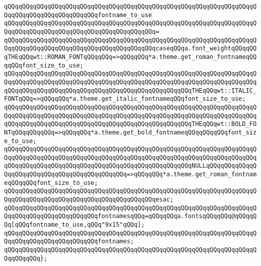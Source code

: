 \newline
\verb|qQQqqQQqqQQqqQQqqQQqqQQqqQQqqQQqqQQqqQQqqQQqqQQqqQQqqQQqqQQqqQQqqQQqqQQqqQQqqQQqqQQqqQQqqQQqqQQqfontname_to_use|\newline
\verb|qQQqqQQqqQQqqQQqqQQqqQQqqQQqqQQqqQQqqQQqqQQqqQQqqQQqqQQqqQQqqQQqqQQqqQQqqQQqqQQqqQQqqQQqqQQqqQQqqQQqqQQqqQQqqQQq=|\newline
\verb|qQQqqQQqqQQqqQQqqQQqqQQqqQQqqQQqqQQqqQQqqQQqqQQqqQQqqQQqqQQqqQQqqQQqqQQqqQQqqQQqqQQqqQQqqQQqqQQqqQQqqQQqqQQqqQQqcaseqQQqa.font_weightqQQqqQQqTHEqQQqwt::ROMAN_FONTqQQqqQQq=>qQQqqQQq*a.theme.get_roman_fontnameqQQqqQQqfont_size_to_use;|\newline
\verb|qQQqqQQqqQQqqQQqqQQqqQQqqQQqqQQqqQQqqQQqqQQqqQQqqQQqqQQqqQQqqQQqqQQqqQQqqQQqqQQqqQQqqQQqqQQqqQQqqQQqqQQqqQQqqQQqqQQqqQQqqQQqqQQqqQQqqQQqqQQqqQQqqQQqqQQqqQQqqQQqqQQqqQQqqQQqqQQqqQQqqQQqqQQqqQQqTHEqQQqwt::ITALIC_FONTqQQq=>qQQqqQQq*a.theme.get_italic_fontnameqQQqfont_size_to_use;|\newline
\verb|qQQqqQQqqQQqqQQqqQQqqQQqqQQqqQQqqQQqqQQqqQQqqQQqqQQqqQQqqQQqqQQqqQQqqQQqqQQqqQQqqQQqqQQqqQQqqQQqqQQqqQQqqQQqqQQqqQQqqQQqqQQqqQQqqQQqqQQqqQQqqQQqqQQqqQQqqQQqqQQqqQQqqQQqqQQqqQQqqQQqqQQqqQQqqQQqTHEqQQqwt::BOLD_FONTqQQqqQQqqQQq=>qQQqqQQq*a.theme.get_bold_fontnameqQQqqQQqqQQqfont_size_to_use;|\newline
\verb|qQQqqQQqqQQqqQQqqQQqqQQqqQQqqQQqqQQqqQQqqQQqqQQqqQQqqQQqqQQqqQQqqQQqqQQqqQQqqQQqqQQqqQQqqQQqqQQqqQQqqQQqqQQqqQQqqQQqqQQqqQQqqQQqqQQqqQQqqQQqqQQqqQQqqQQqqQQqqQQqqQQqqQQqqQQqqQQqqQQqqQQqqQQqqQQqNULLqQQqqQQqqQQqqQQqqQQqqQQqqQQqqQQqqQQqqQQqqQQqqQQq=>qQQqqQQq*a.theme.get_roman_fontnameqQQqqQQqfont_size_to_use;|\newline
\verb|qQQqqQQqqQQqqQQqqQQqqQQqqQQqqQQqqQQqqQQqqQQqqQQqqQQqqQQqqQQqqQQqqQQqqQQqqQQqqQQqqQQqqQQqqQQqqQQqqQQqqQQqqQQqqQQqesac;|\newline
\newline
\verb|qQQqqQQqqQQqqQQqqQQqqQQqqQQqqQQqqQQqqQQqqQQqqQQqqQQqqQQqqQQqqQQqqQQqqQQqqQQqqQQqqQQqqQQqqQQqqQQqfontnamesqQQq=qQQqqQQqa.fontsqQQqqQQq@qQQqqQQq[qQQqfontname_to_use,qQQq"9x15"qQQq];|\newline
\newline
\verb|qQQqqQQqqQQqqQQqqQQqqQQqqQQqqQQqqQQqqQQqqQQqqQQqqQQqqQQqqQQqqQQqqQQqqQQqqQQqqQQqqQQqqQQqqQQqqQQqfontnames;|\newline
\verb|qQQqqQQqqQQqqQQqqQQqqQQqqQQqqQQqqQQqqQQqqQQqqQQqqQQqqQQqqQQqqQQqqQQqqQQqqQQqqQQq};|\newline
\newline
\newline
